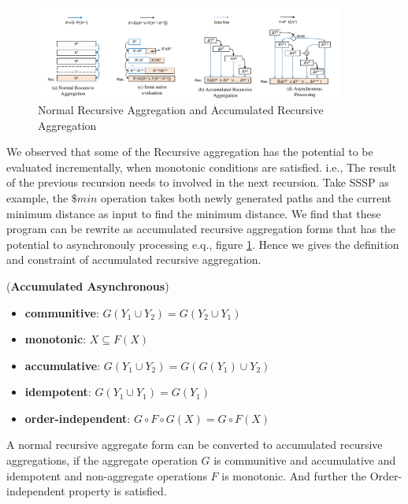 {
	\begin{figure}[t]
		\vspace{-0.1in}
		\centerline{\includegraphics[width=4in]{fig/accumulative.pdf}}
		\caption{Normal Recursive Aggregation and Accumulated Recursive Aggregation }
		\vspace{-0.1in}
		\label{fig:arasssp}
	\end{figure}
	
	We observed that some of the Recursive aggregation has the potential to be evaluated incrementally, when monotonic conditions are satisfied. i.e., The result of the previous recursion needs to involved in the next recursion. Take SSSP as example, the $\$min$ operation takes both newly generated paths and the current minimum distance as input to find the minimum distance. We find that these program can be rewrite as accumulated recursive aggregation forms that has the potential to asynchronouly processing e.q., figure \ref{fig:arasssp}. Hence we gives the definition and constraint of accumulated recursive aggregation.
	
	
	\begin{definition}
		\label{th:monotone}
		(\textbf{Accumulated Asynchronous}) 
		\begin{itemize}
			\item \textbf{communitive}: $G(Y_1\cup Y_2)=G(Y_2\cup Y_1)$
			\item \textbf{monotonic}: $X\subseteq F(X)$
			\item \textbf{accumulative}: $G(Y_1\cup Y_2)=G(G(Y_1)\cup Y_2)$
			\item \textbf{idempotent}: $G(Y_1\cup Y_1)=G(Y_1)$
			\item \textbf{order-independent}: $G\circ F\circ G(X)=G\circ F(X)$
		\end{itemize}
		A normal recursive aggregate form can be converted to accumulated recursive aggregations, if the aggregate operation $G$ is communitive and accumulative and idempotent and non-aggregate operations $F$ is monotonic. And further the Order-independent property is satisfied.
	\end{definition}
	
}
